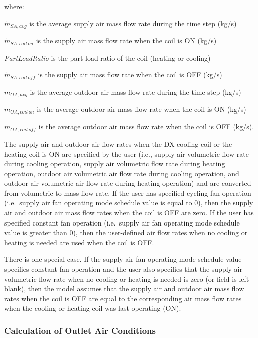 where:

\(\dot{m}_{SA,avg}\) is the average supply air mass flow rate during the time step (kg/s)

\(\dot{m}_{SA,coil~on}\) is the supply air mass flow rate when the coil is ON (kg/s)

\emph{PartLoadRatio} is the part-load ratio of the coil (heating or cooling)

\(\dot{m}_{SA,coil~off}\) is the supply air mass flow rate when the coil is OFF (kg/s)

\(\dot{m}_{OA,avg}\) is the average outdoor air mass flow rate during the time step (kg/s)

\(\dot{m}_{OA,coil~on}\) is the average outdoor air mass flow rate when the coil is ON (kg/s)

\(\dot{m}_{OA,coil~off}\) is the average outdoor air mass flow rate when the coil is OFF (kg/s).

The supply air and outdoor air flow rates when the DX cooling coil or the heating coil is ON are specified by the user (i.e., supply air volumetric flow rate during cooling operation, supply air volumetric flow rate during heating operation, outdoor air volumetric air flow rate during cooling operation, and outdoor air volumetric air flow rate during heating operation) and are converted from volumetric to mass flow rate. If the user has specified cycling fan operation (i.e.~supply air fan operating mode schedule value is equal to 0), then the supply air and outdoor air mass flow rates when the coil is OFF are zero. If the user has specified constant fan operation (i.e.~supply air fan operating mode schedule value is greater than 0), then the user-defined air flow rates when no cooling or heating is needed are used when the coil is OFF.

There is one special case. If the supply air fan operating mode schedule value specifies constant fan operation and the user also specifies that the supply air volumetric flow rate when no cooling or heating is needed is zero (or field is left blank), then the model assumes that the supply air and outdoor air mass flow rates when the coil is OFF are equal to the corresponding air mass flow rates when the cooling or heating coil was last operating (ON).

\subsubsection{Calculation of Outlet Air Conditions}\label{calculation-of-outlet-air-conditions}

